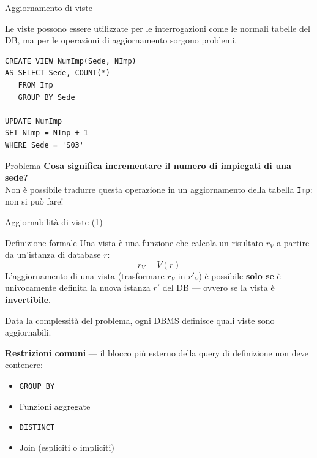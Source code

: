 \documentclass[aspectratio=169]{beamer}
\begin{document}
\begin{frame}[fragile]{Aggiornamento di viste}

Le viste possono essere utilizzate per le interrogazioni come le normali tabelle del DB, ma per le \alert{operazioni di aggiornamento} sorgono problemi.

\begin{lstlisting}
CREATE VIEW NumImp(Sede, NImp)
AS SELECT Sede, COUNT(*)
   FROM Imp
   GROUP BY Sede

UPDATE NumImp
SET NImp = NImp + 1
WHERE Sede = 'S03'
\end{lstlisting}

\begin{alertblock}{Problema}
\textbf{Cosa significa incrementare il numero di impiegati di una sede?} \\
Non è possibile tradurre questa operazione in un aggiornamento della tabella \texttt{Imp}: \alert{non si può fare!}
\end{alertblock}

\end{frame}

\begin{frame}{Aggiornabilità di viste (1)}

\begin{block}{Definizione formale}
Una vista è una funzione che calcola un risultato $r_V$ a partire da un'istanza di database $r$:
$$r_V = V(r)$$
L'aggiornamento di una vista (trasformare $r_V$ in $r'_V$) è possibile \textbf{solo se} è univocamente definita la nuova istanza $r'$ del DB — ovvero se la vista è \textbf{invertibile}.
\end{block}

\vspace{8pt}
Data la complessità del problema, ogni DBMS definisce quali viste sono aggiornabili.

\vspace{6pt}
\textbf{Restrizioni comuni} — il blocco più esterno della query di definizione non deve contenere:
\begin{itemize}
  \item \texttt{GROUP BY}
  \item Funzioni aggregate
  \item \texttt{DISTINCT}
  \item Join (espliciti o impliciti)
\end{itemize}

\end{frame}
\end{document}
